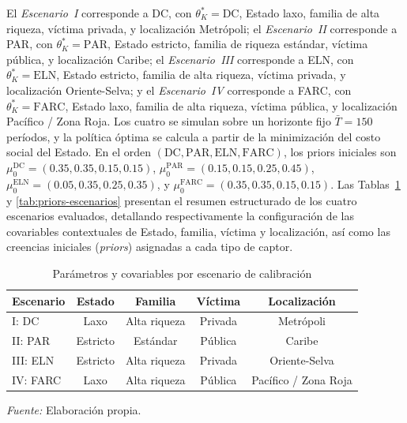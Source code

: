 \documentclass[review,authoryear,12pt]{elsarticle}
\theoremstyle{plain}
\theoremstyle{definition}
\newcommand{\1}{\mathbf{1}}
\begin{document}
El \emph{Escenario~I} corresponde a DC, con $\theta_K^\ast=\mathrm{DC}$, Estado laxo, familia de alta riqueza, víctima privada, y localización Metrópoli; el \emph{Escenario~II} corresponde a PAR, con $\theta_K^\ast=\mathrm{PAR}$, Estado estricto, familia de riqueza estándar, víctima pública, y localización Caribe; el \emph{Escenario~III} corresponde a ELN, con $\theta_K^\ast=\mathrm{ELN}$, Estado estricto, familia de alta riqueza, víctima privada, y localización Oriente-Selva; y el \emph{Escenario~IV} corresponde a FARC, con $\theta_K^\ast=\mathrm{FARC}$, Estado laxo, familia de alta riqueza, víctima pública, y localización Pacífico / Zona Roja. Los cuatro se simulan sobre un horizonte fijo $\bar{T}=150$ períodos, y la política óptima se calcula a partir de la minimización del costo social del Estado. En el orden $(\mathrm{DC},\mathrm{PAR},\mathrm{ELN},\mathrm{FARC})$, los priors iniciales son $\mu_0^{\mathrm{DC}}=(0.35,0.35,0.15,0.15)$, $\mu_0^{\mathrm{PAR}}=(0.15,0.15,0.25,0.45)$, $\mu_0^{\mathrm{ELN}}=(0.05,0.35,0.25,0.35)$, y $\mu_0^{\mathrm{FARC}}=(0.35,0.35,0.15,0.15)$. Las Tablas~\ref{tab:covariables-escenarios} y \ref{tab:priors-escenarios} presentan el resumen estructurado de los cuatro escenarios evaluados, detallando respectivamente la configuración de las covariables contextuales de Estado, familia, víctima y localización, así como las creencias iniciales (\emph{priors}) asignadas a cada tipo de captor.

\begin{table}[htbp]
\centering
\small
\caption{Parámetros y covariables por escenario de calibración}
\label{tab:covariables-escenarios}
\begin{tabular}{lcccc}
\toprule
Escenario & Estado & Familia & Víctima & Localización \\ \midrule
I: DC & Laxo & Alta riqueza & Privada & Metrópoli \\
II: PAR & Estricto & Estándar & Pública & Caribe \\
III: ELN & Estricto & Alta riqueza & Privada & Oriente-Selva \\
IV: FARC & Laxo & Alta riqueza & Pública & Pacífico / Zona Roja \\ \bottomrule
\end{tabular}
\par\smallskip\footnotesize \textit{Fuente:} Elaboración propia.
\end{table}
\end{document}
